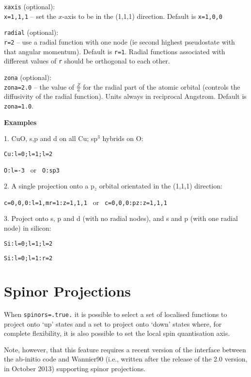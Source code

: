 \noindent
\verb#xaxis# (optional):\\
\verb#x=1,1,1#  --  set the $x$-axis to be in the (1,1,1) direction. Default is
\verb#x=1,0,0#

\noindent
\verb#radial# (optional):\\
\verb#r=2#      --  use a radial function with one node (ie second highest
pseudostate with that angular momentum). Default is
\verb#r=1#. Radial functions associated with different values of
\verb#r# should be orthogonal to each other.

\noindent
\verb#zona# (optional):\\
\verb#zona=2.0# -- the value of $\frac{Z}{a}$ for the radial part of the
atomic orbital (controls the diffusivity of the radial
function). Units always in reciprocal Angstrom. Default is \verb#zona=1.0#.



\noindent
\textbf{Examples}

1. CuO, s,p and d on all Cu; sp$^3$ hybrids on O:

\verb#Cu:l=0;l=1;l=2 #

\verb#O:l=-3 #  or  \verb# O:sp3#

2. A single projection onto a p$_z$ orbital orientated in the (1,1,1)
 direction:

\verb#c=0,0,0:l=1,mr=1:z=1,1,1 # or \verb# c=0,0,0:pz:z=1,1,1#

3. Project onto s, p and d (with no radial nodes), and s and p (with one
   radial node) in silicon:

\verb#Si:l=0;l=1;l=2#

\verb#Si:l=0;l=1:r=2#

\section{Spinor Projections}
When \verb#spinors=.true.# it is possible to select a set of localised
functions to project onto `up' states and a set to project onto `down'
states where, for complete flexibility, it is also possible to set the
local spin quantisation axis.

Note, however, that this feature requires a recent version of the
interface between the ab-initio code and Wannier90 (i.e., written after
the release of the 2.0 version, in October 2013) supporting
spinor projections.

